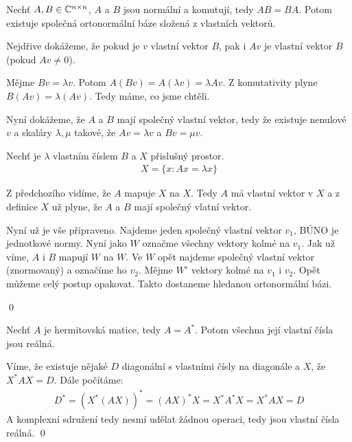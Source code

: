 \vt Nechť $A, B \in \mathbb{C}^{n\times n}$, $A$ a $B$ jsou normální a komutují, tedy $AB = BA$. Potom existuje společná ortonormální báze složená z vlastních vektorů.

\dk
Nejdřive dokážeme, že pokud je $v$ vlastní vektor $B$, pak i $Av$ je vlastní vektor $B$ (pokud $Av \neq 0$).

Mějme $Bv = \lambda v$. Potom $A(Bv) = A(\lambda v) = \lambda Av$. Z komutativity plyne $B(Av) = \lambda (Av)$. Tedy máme, co jsme chtěli.

Nyní dokážeme, že $A$ a $B$ mají společný vlastní vektor, tedy že existuje nenulové $v$ a
skaláry $\lambda, \mu$ takové, že $Av = \lambda v$ a $Bv = \mu v$.

Nechť je $\lambda$ vlastním číslem $B$ a $X$ přislušný prostor.
\begin{align}
	X = \{ x: Ax = \lambda x \}
\end{align}

Z předchozího vidíme, že $A$ mapuje $X$ na $X$. Tedy $A$ má vlastní vektor v $X$ a z definice $X$ už plyne, že $A$ a $B$ mají společný vlatní vektor.

Nyní už je vše připraveno. Najdeme jeden společný vlastní vektor $v_1$, BÚNO je jednotkové normy. Nyní jako $W$ označme všechny vektory kolmé na $v_1$.
Jak už víme, $A$ i $B$ mapují $W$ na $W$. Ve $W$ opět najdeme společný vlastní vektor (znormovaný) a označíme ho $v_2$. Mějme $W'$ vektory kolmé na $v_1$ i $v_2$.
Opět můžeme celý postup opakovat. Takto dostaneme hledanou ortonormální bázi.

\qed

\vt Nechť $A$ je hermitovská matice, tedy $A = A^*$. Potom všechna její vlastní čísla jsou reálná.

\dk Víme, že existuje nějaké $D$ diagonální s vlastními čísly na diagonále a $X$, že $X^*AX = D$. Dále počítáme:
\begin{align}
	D^* = (X^*(AX))^* = (AX)^*X = X^*A^*X = X^*AX = D
\end{align}
A komplexní sdružení tedy nesmí udělat žádnou operaci, tedy jsou vlastní čísla reálná. \qed


